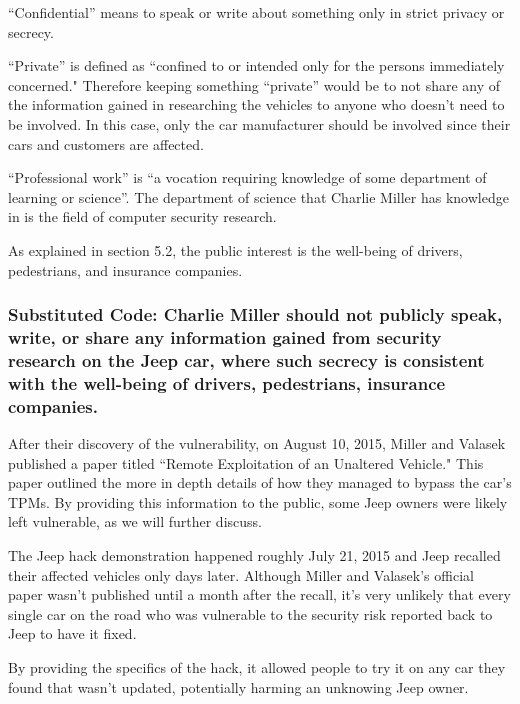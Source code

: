 \documentclass[12pt]{article}
\begin{document}
\begin{multicols}{2}
``Confidential'' means to speak or write about something only in strict privacy or secrecy.\cite{dictionary}

``Private'' is defined as ``confined to or intended only for the persons immediately concerned."\cite{dictionary} Therefore keeping something ``private'' would be to not share any of the information gained in researching the vehicles to anyone who doesn't need to be involved. In this case, only the car manufacturer should be involved since their cars and customers are affected. 

``Professional work'' is ``a vocation requiring knowledge of some department of learning or science''\cite{dictionary}. The department of science that Charlie Miller has knowledge in is the field of computer security research. 

As explained in section 5.2, the public interest is the well-being of drivers, pedestrians, and insurance companies.


\subsubsection{Substituted Code: Charlie Miller should not publicly speak, write, or share any information gained from security research on the Jeep car, where such secrecy is consistent with the well-being of drivers, pedestrians, insurance companies.}



After their discovery of the vulnerability, on August 10, 2015, Miller and Valasek published a paper titled ``Remote Exploitation of an Unaltered Vehicle."\cite{officialPaper} This paper outlined the more in depth details of how they managed to bypass the car's TPMs. By providing this information to the public, some Jeep owners were likely left vulnerable, as we will further discuss.


The Jeep hack demonstration happened roughly July 21, 2015\cite{wired} and Jeep recalled their affected vehicles only days later.\cite{recall} Although Miller and Valasek's official paper wasn't published until a month after the recall, it's very unlikely that every single car on the road who was vulnerable to the security risk reported back to Jeep to have it fixed. 

By providing the specifics of the hack, it allowed people to try it on any car they found  that wasn't updated, potentially harming an unknowing Jeep owner. 


\end{multicols}
\end{document}
